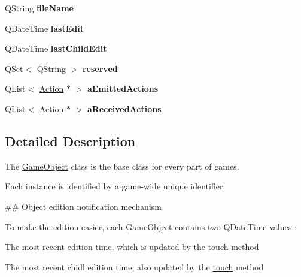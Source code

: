 \begin{DoxyCompactItemize}
\item 
\hypertarget{class_game_object_a8e62a0d6755b2930090348622f482f6d}{\-Q\-String {\bfseries file\-Name}}\label{class_game_object_a8e62a0d6755b2930090348622f482f6d}

\item 
\hypertarget{class_game_object_ac1a61f57d5a318b86c4f2bbb4dbde78f}{\-Q\-Date\-Time {\bfseries last\-Edit}}\label{class_game_object_ac1a61f57d5a318b86c4f2bbb4dbde78f}

\item 
\hypertarget{class_game_object_ae0a43c76fc9171015b43d008b5ffcbfd}{\-Q\-Date\-Time {\bfseries last\-Child\-Edit}}\label{class_game_object_ae0a43c76fc9171015b43d008b5ffcbfd}

\item 
\hypertarget{class_game_object_a66ba1ad1dca3c7b2ae424407fce76d66}{\-Q\-Set$<$ \-Q\-String $>$ {\bfseries reserved}}\label{class_game_object_a66ba1ad1dca3c7b2ae424407fce76d66}

\item 
\hypertarget{class_game_object_ab2cbc6752c4630e0431594f4d4eee1a1}{\-Q\-List$<$ \hyperlink{class_action}{\-Action} $\ast$ $>$ {\bfseries a\-Emitted\-Actions}}\label{class_game_object_ab2cbc6752c4630e0431594f4d4eee1a1}

\item 
\hypertarget{class_game_object_a6df70a8ad0d2bacf582c5f53e48430cd}{\-Q\-List$<$ \hyperlink{class_action}{\-Action} $\ast$ $>$ {\bfseries a\-Received\-Actions}}\label{class_game_object_a6df70a8ad0d2bacf582c5f53e48430cd}

\end{DoxyCompactItemize}


\subsection{\-Detailed \-Description}
\-The \hyperlink{class_game_object}{\-Game\-Object} class is the base class for every part of games. 

\-Each instance is identified by a game-\/wide unique identifier.

\#\# \-Object edition notification mechanism

\-To make the edition easier, each \hyperlink{class_game_object}{\-Game\-Object} contains two \-Q\-Date\-Time values \-:
\begin{DoxyItemize}
\item \-The most recent edition time, which is updated by the \hyperlink{class_game_object_a2130d5674df041b5a7eaf987f9b1e642}{touch} method
\item \-The most recent chidl edition time, also updated by the \hyperlink{class_game_object_a2130d5674df041b5a7eaf987f9b1e642}{touch} method
\end{DoxyItemize}


